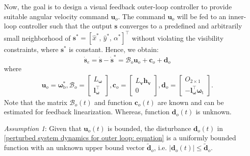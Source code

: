 \documentclass[lettersize,journal]{IEEEtran}
\begin{document}
Now, the goal is to design a visual feedback outer-loop controller to provide suitable angular velocity command $\boldsymbol{u}_o$. The command $\boldsymbol{u}_o$ will be fed to an inner-loop controller such that the output $\boldsymbol{s}$ converges to a predefined and arbitrarily small neighborhood of $\boldsymbol{s}^* = [\hat{x}^*,\, \hat{y}^*,\, \alpha^*]^{\top}$ without violating the visibility constraints, where $\boldsymbol{s}^*$ is constant. Hence, we obtain:
\begin{equation} \label{perturbed system dynamics for outer loop: equation}
    \dot{\boldsymbol{s}}_e = \dot{\boldsymbol{s}} - \dot{\boldsymbol{s}}^* = \mathcal{B}_o \boldsymbol{u}_o + \boldsymbol{c}_o + \boldsymbol{d}_o
\end{equation}
where
\begin{align*}
    \boldsymbol{u}_o = \boldsymbol{\omega}_{\text{b}}^*, 
    \mathcal{B}_o =\begin{bmatrix} L_{\boldsymbol{\omega}} \\ \boldsymbol{l}_{\boldsymbol{\omega}}^{\top} \end{bmatrix},
    \boldsymbol{c}_o = \begin{bmatrix} L_{\boldsymbol{v}} \boldsymbol{h}_{\boldsymbol{v}} \\ 0 \end{bmatrix}, 
    \boldsymbol{d}_o = \begin{bmatrix}  O_{2 \times 1} \\ -\boldsymbol{l}_{\boldsymbol{\omega}}^{\top} \boldsymbol{\omega}_{\text{t}} \end{bmatrix}.
\end{align*}
Note that the matrix $\mathcal{B}_o(t)$ and function $\boldsymbol{c}_o(t)$ are known and can be estimated for feedback linearization. Whereas, function $\boldsymbol{d}_o(t)$ is unknown.

\textit{Assumption 1}: Given that $\boldsymbol{u}_o(t)$ is bounded, the disturbance $\boldsymbol{d}_o(t)$ in \eqref{perturbed system dynamics for outer loop: equation} is a uniformly bounded function with an unknown upper bound vector $\tilde{\boldsymbol{d}}_{o}$, i.e. $\lvert \boldsymbol{d}_o(t) \rvert \leq \tilde{\boldsymbol{d}}_{o}$.
\end{document}

